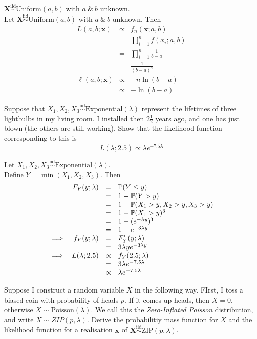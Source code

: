 \documentclass[11pt,a4paper]{article}
\begin{document}
\qpartnb $\textbf{X}\overset{\mathrm{iid}}{\sim}\mathrm{Uniform}(a,b)$ with $a\ \&\ b$ unknown.\\

\apart
Let $\textbf{X}\overset{\mathrm{iid}}{\sim}\mathrm{Uniform}(a,b)$ with $a\ \&\ b$ unknown. Then
\[\begin{array}{rcl}
L(a,b;\textbf{x})&\propto&f_n(\textbf{x};a,b)\\
&=&\prod\limits_{i=1}^nf(x_i;a,b)\\
&=&\prod\limits_{i=1}^n\frac{1}{b-a}\\
&=&\frac{1}{(b-a)^n}\\
\ell(a,b;\textbf{x})&\propto&-n\ln(b-a)\\
&\propto&-\ln(b-a)
\end{array}\]

\question
Suppose that $X_1,X_2,X_3\overset{\mathrm{iid}}{\sim}\mathrm{Exponential}(\lambda)$ represent the lifetimes of three lightbulbs in my living room. I installed then $2\frac{1}{2}$ years ago, and one has just blown (the others are still working). Show that the likelihood function corresponding to this is
$$L(\lambda;2.5)\propto\lambda e^{-7.5\lambda}$$

\ans
Let $X_1,X_2,X_3\overset{\mathrm{iid}}{\sim}\mathrm{Exponential}(\lambda)$.\\
Define $Y=\min(X_1,X_2,X_3)$. Then
\[\begin{array}{rrcl}
&F_Y(y;\lambda)&=&\mathbb{P}(Y\leq y)\\
&&=&1-\mathbb{P}(Y>y)\\
&&=&1-\mathbb{P}(X_1>y,X_2>y,X_3>y)\\
&&=&1-\mathbb{P}(X_1>y)^3\\
&&=&1-(e^{-\lambda y})^3\\
&&=&1-e^{-3\lambda y}\\
\implies&f_Y(y;\lambda)&=&F_Y'(y;\lambda)\\
&&=&3\lambda ye^{-3\lambda y}\\
\implies&L(\lambda;2.5)&\propto&f_Y(2.5;\lambda)\\
&&=&3\lambda e^{-7.5\lambda}\\
&&\propto&\lambda e^{-7.5\lambda}
\end{array}\]

\question
Suppose I construct a random variable $X$ in the following way. FIrst, I toss a biased coin with probability of heads $p$. If it comes up heads, then $X=0$, otherwise $X\sim\mathrm{Poisson}(\lambda)$. We call this the \textit{Zero-Inflated Poisson} distribution, and write $X\sim ZIP(p,\lambda)$. Derive the probabilitiy mass function for $X$ and the likelihood function for a realisation $\textbf{x}$ of $\textbf{X}\overset{\mathrm{iid}}{\sim}\mathrm{ZIP}(p,\lambda)$.\\
\end{document}
